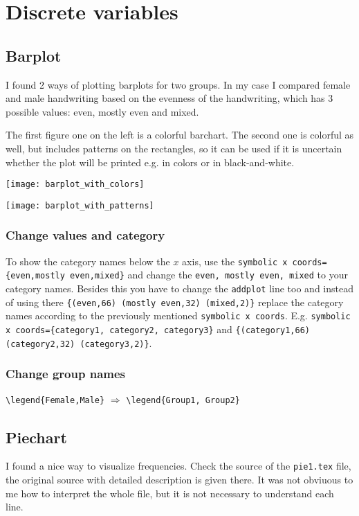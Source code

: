 \documentclass[a4paper]{article}
\begin{document}
	
	
	\section{Discrete variables}
	\subsection{Barplot}
	I found 2 ways of plotting barplots for two  groups. In my case I compared female and male handwriting based on the evenness of the handwriting, which has 3 possible values: even, mostly even and mixed. 
	
	The first figure one on the left is a colorful barchart. The second one is colorful as well, but includes patterns on the rectangles, so it can be used if it is uncertain whether the plot will be printed e.g. in colors or in black-and-white. 
	
	\begin{multicols}{2}	
		\texttt{[image: barplot\_with\_colors]}
			
		\texttt{[image: barplot\_with\_patterns]}
	\end{multicols}
	
	\subsubsection*{Change values and category}
	To show the category names below the $x$  axis, use the \verb.symbolic x coords={even,mostly even,mixed}. and change the 
	\texttt{even, mostly even, mixed} to your category names. Besides this you have to change the \texttt{addplot} line too and 
instead of using there \verb.{(even,66) (mostly even,32) (mixed,2)}. replace the category names according to the previously mentioned \texttt{symbolic x coords}. E.g. \verb.symbolic x coords={category1, category2, category3}. and \verb.{(category1,66) (category2,32) (category3,2)}..

		
	\subsubsection*{Change group names}
	\verb.\legend{Female,Male}. $\Rightarrow$ \verb.\legend{Group1, Group2}.

	
	
	\subsection{Piechart}
	I found a nice way to visualize frequencies. Check the source of the \texttt{pie1.tex} file, the original source with detailed description is given there.  It was not obviuous to me how to interpret the whole file, but it is not necessary to understand each line.
		
\end{document}
